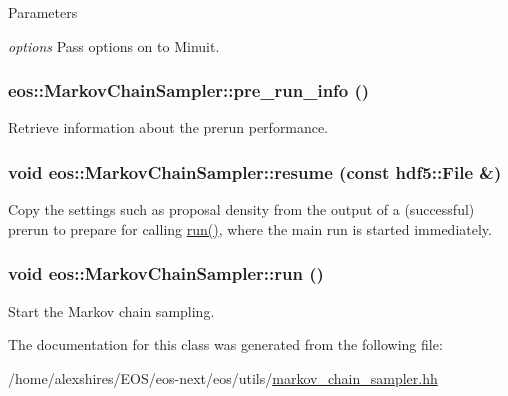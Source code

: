 \begin{DoxyParams}{Parameters}
\item[{\em options}]Pass options on to Minuit. \end{DoxyParams}
\hypertarget{classeos_1_1MarkovChainSampler_ae3032467d9678870bb30f82ae060c043}{
\subsubsection[{pre\_\-run\_\-info}]{ eos::MarkovChainSampler::pre\_\-run\_\-info ()}}
\label{classeos_1_1MarkovChainSampler_ae3032467d9678870bb30f82ae060c043}


Retrieve information about the prerun performance. \hypertarget{classeos_1_1MarkovChainSampler_a15f768e042ec2189ae7fb837d0c4f341}{
\subsubsection[{resume}]{\setlength{\rightskip}{0pt plus 5cm}void eos::MarkovChainSampler::resume (const {\bf hdf5::File} \&)}}
\label{classeos_1_1MarkovChainSampler_a15f768e042ec2189ae7fb837d0c4f341}
Copy the settings such as proposal density from the output of a (successful) prerun to prepare for calling \hyperlink{classeos_1_1MarkovChainSampler_a67fdd21c364b34796c9c5ba2b3b0b785}{run()}, where the main run is started immediately. \hypertarget{classeos_1_1MarkovChainSampler_a67fdd21c364b34796c9c5ba2b3b0b785}{
\subsubsection[{run}]{\setlength{\rightskip}{0pt plus 5cm}void eos::MarkovChainSampler::run ()}}
\label{classeos_1_1MarkovChainSampler_a67fdd21c364b34796c9c5ba2b3b0b785}


Start the Markov chain sampling. 

The documentation for this class was generated from the following file:\begin{DoxyCompactItemize}
\item 
/home/alexshires/EOS/eos-\/next/eos/utils/\hyperlink{markov__chain__sampler_8hh}{markov\_\-chain\_\-sampler.hh}\end{DoxyCompactItemize}

